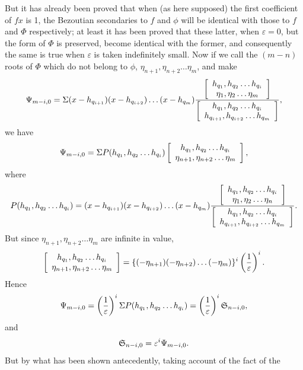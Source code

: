 \documentclass[11pt]{article}
\begin{document}
But it has already been proved that when (as here supposed) the first coefficient of $fx$ is 1, the Bezoutian secondaries to $f$ and $\phi$ will be identical with those to $f$ and $\Phi$ respectively; at least it has been proved that these latter, when $\varepsilon=0$, but the form of $\Phi$ is preserved, become identical with the former, and consequently the same is true when $\varepsilon$ is taken indefinitely small. Now if we call the $(m-n)$ roots of $\Phi$ which do not belong to $\phi$, $\eta_{n+1},\eta_{n+2}\ldots\eta_m$, and make
\[
\Psi_{m-i,0}=\Sigma(x-h_{q_{i+1}})(x-h_{q_{i+2}})\ldots(x-h_{q_m})
\frac{\left[\begin{array}{c}h_{q_1},h_{q_2}\ldots h_{q_i}\\\eta_1,\eta_2\ldots\eta_m\end{array}\right]}{\left[\begin{array}{c}h_{q_1},h_{q_2}\ldots h_{q_i}\\h_{q_{i+1}},h_{q_{i+2}}\ldots h_{q_m}\end{array}\right]},
\]
we have
\[
\Psi_{m-i,0}=\Sigma P(h_{q_1},h_{q_2}\ldots h_{q_i})
\left[\begin{array}{c}h_{q_1},h_{q_2}\ldots h_{q_i}\\\eta_{n+1},\eta_{n+2}\ldots\eta_m\end{array}\right],
\]
where
\[
P(h_{q_1},h_{q_2}\ldots h_{q_i})=(x-h_{q_{i+1}})(x-h_{q_{i+2}})\ldots(x-h_{q_m})
\frac{\left[\begin{array}{c}h_{q_1},h_{q_2}\ldots h_{q_i}\\\eta_1,\eta_2\ldots\eta_n\end{array}\right]}{\left[\begin{array}{c}h_{q_1},h_{q_2}\ldots h_{q_i}\\h_{q_{i+1}},h_{q_{i+2}}\ldots h_{q_m}\end{array}\right]}.
\]
But since $\eta_{n+1},\eta_{n+2}\ldots\eta_m$ are infinite in value,
\[
\left[\begin{array}{c}h_{q_1},h_{q_2}\ldots h_{q_i}\\\eta_{n+1},\eta_{n+2}\ldots\eta_m\end{array}\right]
=\{(-\eta_{n+1})(-\eta_{n+2})\ldots(-\eta_m)\}^i\left(\frac1\varepsilon\right)^i.
\]
Hence
\[
\Psi_{m-i,0}=\left(\frac1\varepsilon\right)^i\Sigma P(h_{q_1},h_{q_2}\ldots h_{q_i})
=\left(\frac1\varepsilon\right)^i\mathfrak{S}_{n-i,0},
\]
and
\[
\mathfrak{S}_{n-i,0}=\varepsilon^i\Psi_{m-i,0}.
\]
But by what has been shown antecedently, taking account of the fact of the
\end{document}
